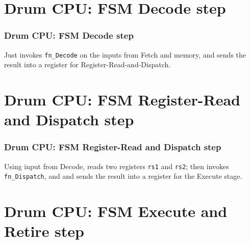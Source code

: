 
\section{Drum CPU: FSM Decode step}

\begin{frame}[fragile]
\frametitle{Drum CPU: FSM Decode step}

\footnotesize

\begin{minipage}{0.75\textwidth}
\end{minipage}
\hm
\begin{minipage}{0.2\textwidth}
 Just invokes {\tt fn\_Decode} on the inputs from Fetch and memory,
 and sends the result into a register for Register-Read-and-Dispatch.
\end{minipage}

\end{frame}


\section{Drum CPU: FSM Register-Read and Dispatch step}

\begin{frame}[fragile]
\frametitle{Drum CPU: FSM Register-Read and Dispatch step}

\footnotesize

\begin{minipage}{0.75\textwidth}
\end{minipage}
\hm
\begin{minipage}{0.2\textwidth}
 Using input from Decode, reads two registers {\tt rs1} and {\tt rs2};
 then invokes {\tt fn\_Dispatch}, and
 and sends the result into a register for the Execute stage.
\end{minipage}

\end{frame}


\section{Drum CPU: FSM Execute and Retire step}

